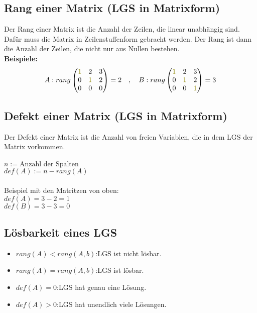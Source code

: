 \documentclass[12pt,a4paper]{article}
\begin{document}
\subsection{Rang einer Matrix (LGS in Matrixform)}
Der Rang einer Matrix ist die Anzahl der Zeilen, die linear unabhängig sind. \\ Dafür muss die Matrix in Zeilenstuffenform gebracht werden. Der Rang ist dann die Anzahl der Zeilen, die nicht nur aus Nullen bestehen. \\
\textbf{Beispiele:}
\[
A:
rang
\begin{pmatrix}
\textcolor{olive}{1} & 2 & 3 \\
0 & \textcolor{olive}{1} & 2 \\
0 & 0 & 0
\end{pmatrix}
= 2
\quad
,
\quad
B:
rang
\begin{pmatrix}
\textcolor{olive}{1} & 2 & 3 \\
0 & \textcolor{olive}{1} & 2 \\
0 & 0 & \textcolor{olive}{1}
\end{pmatrix}
= 3
\]

\subsection{Defekt einer Matrix (LGS in Matrixform)}
Der Defekt einer Matrix ist die Anzahl von freien Variablen, die in dem LGS der Matrix vorkommen. \\ \\
$n := \text{Anzahl der Spalten}$ \\
$def(A) := n - rang(A)$ \\ \\
Beispiel mit den Matritzen von oben: \\
$def(A) = 3 - 2 = 1$\\
$def(B) = 3 - 3 = 0$

\subsection{Lösbarkeit eines LGS}
\begin{itemize}
    \item $rang(A) <  rang(A, b)$:\quad LGS ist nicht lösbar.
    \item $rang(A) = rang(A, b)$:\quad LGS ist lösbar.
    \item $def(A) = 0$:\quad LGS hat genau eine Lösung.
    \item $def(A) > 0$:\quad LGS hat unendlich viele Lösungen.
\end{itemize}
\end{document}
